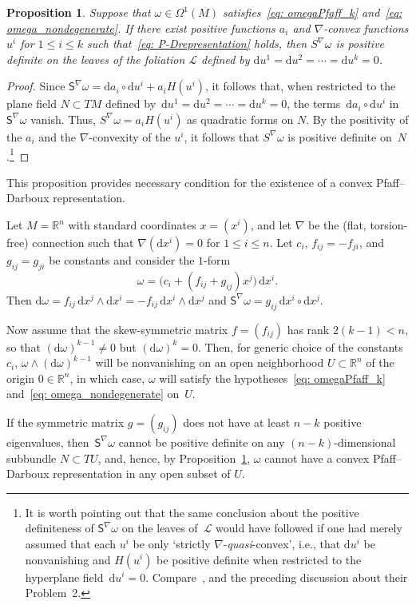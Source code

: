 \documentclass[11pt]{article}
\numberwithin{equation}{section}
\renewcommand{\d}{\mathrm{d}}%
\newcommand{\cL}{{\mathcal L}}
\newcommand{\Ss}{\mathsf{S}}
\newcommand{\w}{\wedge}
\numberwithin{equation}{section}
\newtheorem{Proposition}[Theorem]{Proposition}
 { \theoremstyle{definition}
\newtheorem{Definition}[Theorem]{Definition}
\newtheorem{Note}[Theorem]{Note}
\newtheorem{Example}[Theorem]{Example}
\newtheorem{Remark}[Theorem]{Remark} }
\begin{document}
\begin{Proposition}\label{prop: ness cond}
Suppose that $\omega\in\Omega^1(M)$ satisfies~\eqref{eq: omegaPfaff_k}
and~\eqref{eq: omega_nondegenerate}. If there exist positive
functions $a_i$ and $\nabla$-convex functions $u^i$ for $1\le i\le k$
such that~\eqref{eq: P-Drepresentation} holds, then $S^\nabla\omega$
is positive definite on the leaves of the foliation $\cL$ defined by
$\d u^1 = \d u^2 = \cdots = \d u^k = 0$.
\end{Proposition}

\begin{proof}
Since $\Ss^\nabla\omega =\d a_i\circ \d u^i + a_i H(u^i)$,
it follows that, when restricted to the plane field ${N\subset TM}$
defined by~$\d u^1 = \d u^2 = \cdots = \d u^k = 0$,
the terms~$\d a_i\circ \d u^i$ in~$\Ss^\nabla\omega$
vanish. Thus, $S^\nabla\omega = a_i H(u^i)$
as quadratic forms on $N$. By the positivity of the $a_i$
and the $\nabla$-convexity of the $u^i$, it follows that
$S^\nabla\omega$ is positive definite on~$N$.\footnote{It is worth pointing out that the same conclusion
about the positive definiteness of $\Ss^\nabla\omega$ on the leaves of~$\cL$
would have followed if one had merely assumed that each $u^i$
be only `strictly $\nabla$-\emph{quasi}-convex',
i.e., that $\d u^i$ be nonvanishing and $H(u^i)$ be positive definite
when restricted to the hyperplane field~$\d u^i = 0$.
Compare~\cite[Lemma~1]{MR2023129},
and the preceding discussion about their Problem~2.}
\end{proof}

This proposition provides necessary condition for the existence
of a convex Pfaff--Darboux representation.

\begin{Example}\label{ex: Obstruction}
Let $M=\mathbb{R}^n$ with standard coordinates $x=(x^i)$,
and let $\nabla$ be the (flat, torsion-free) connection
such that $\nabla(\d x^i)=0$ for $1\le i\le n$.
Let $c_i$, $f_{ij}=-f_{ji}$, and $g_{ij}=g_{ji}$
be constants and consider the $1$-form
\[
\omega = \bigl(c_i + (f_{ij}+g_{ij})x^j)\,\d x^i.
\]
Then $\d\omega= f_{ij}\,\d x^j\w\d x^i = - f_{ij}\,\d x^i\w\d x^j$
and $\Ss^\nabla\omega = g_{ij}\,\d x^i\circ\d x^j$.

Now assume that the skew-symmetric matrix $f = (f_{ij})$
has rank $2(k{-}1)<n$, so that $(\d\omega)^{k-1}\not=0$
but $(\d\omega)^{k}=0$.
Then, for generic choice of the constants $c_i$,
$\omega\w(\d\omega)^{k-1}$ will be nonvanishing on an open neighborhood $U\subset\mathbb{R}^n$ of the origin $0\in\mathbb{R}^n$,
in which case, $\omega$ will satisfy the hypotheses~\eqref{eq: omegaPfaff_k}
and~\eqref{eq: omega_nondegenerate} on~$U$.

If the symmetric matrix $g = (g_{ij})$
does not have at least $n{-}k$ positive eigenvalues,
then~$\Ss^\nabla\omega$ cannot be positive definite on
any $(n{-}k)$-dimensional subbundle $N\subset TU$, and, hence,
by Proposition~\ref{prop: ness cond}, $\omega$ cannot have a convex Pfaff--Darboux
representation in any open subset of $U$.
\end{Example}
\end{document}
